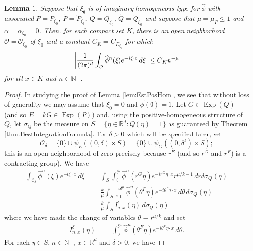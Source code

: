 \documentclass[11pt]{article}
\newtheorem{lemma}[theorem]{Lemma}
\newcommand\Exp{\operatorname{Exp}}
\newcommand{\f}[2]{\frac{#1}{#2}}
\begin{document}
\begin{lemma}
Suppose that $\xi_0$ is of imaginary homogeneous type for $\widehat{\phi}$ with associated $P=P_{\xi_0}$, $\widetilde{P}=\widetilde{P}_{\xi_0}$,  $Q=Q_{\xi_0}$, $\widetilde{Q}=\widetilde{Q}_{\xi_0}$ and suppose that $\mu=\mu_P\leq 1$ and $\alpha=\alpha_{\xi_0}=0$. Then, for each compact set $K$, there is an open neighborhood $\mathcal{O}=\mathcal{O}_{\xi_0}$ of $\xi_0$ and a constant $C_K=C_{K_{\xi_0}}$ for which
\begin{equation*}
    \abs{\f{1}{(2\pi)^d}\int_{\mathcal{O}}\widehat{\phi}^n(\xi)e^{-i\xi\cdot x}\,d\xi}\leq C_Kn^{-\mu}
\end{equation*}
for all $x\in K$ and $n\in\mathbb{N}_+$.
\end{lemma}
\begin{proof}
In studying the proof of Lemma \ref{lem:EstPosHom}, we see that without loss of generality we may assume that $\xi_0=0$ and $\widehat{\phi}(0)=1$. Let $G\in \Exp(Q)$ (and so $E=kG\in \Exp(P)$) %
and, using the positive-homogeneous structure of $Q$, let $\sigma_Q$ be the measure on $S=\{\eta\in \mathbb{R}^d:Q(\eta)=1\}$ as guaranteed by Theorem \ref{thm:BestIntegrationFormula}. For $\delta>0$ which will be specified later, set
\begin{equation*}
    \mathcal{O}_{\delta}=\{0\}\cup\psi_E((0,\delta)\times S)=\{0\}\cup \psi_G((0,\delta^{k})\times S);
\end{equation*}
this is an open neighborhood of zero precisely because $r^E$ (and so $r^G$ and $r^F$) is a contracting group). We have
\begin{eqnarray*}
    \int_{\mathcal{O}_{\delta}}\widehat{\phi}^n(\xi)e^{-i\xi\cdot x}\,d\xi
    &=&
    \int_S\int_0^{\delta^{k}}\widehat{\phi}^n(r^G\eta)e^{-ir^G\eta\cdot x}r^{\mu/k-1}\,dr d\sigma_Q(\eta)\\
    &=&
    \frac{k}{\mu}\int_S \int_0^{\delta^{\mu}} \widehat{\phi}^n(\theta^{F} \eta) e^{-i \theta^F \eta\cdot x}  \,d\theta \,d\sigma_Q(\eta)\\
    &=&
    \frac{k}{\mu}\int_S I^\delta_{n,x}(\eta)\,d\sigma_Q(\eta)
\end{eqnarray*}
where we have made the change of variables $\theta=r^{\mu/ k}$ and set
\begin{eqnarray*}
    I^\delta_{n,x}(\eta)&=&\int_0^{\delta^{\mu}}\widehat{\phi}^n(\theta^F\eta)e^{-i\theta^F\eta\cdot x}\,d\theta.
\end{eqnarray*}
For each $\eta\in S$, $n\in\mathbb{N}_+$, $x\in\mathbb{R}^d$ and $\delta>0$, we have

\end{proof}
\end{document}
